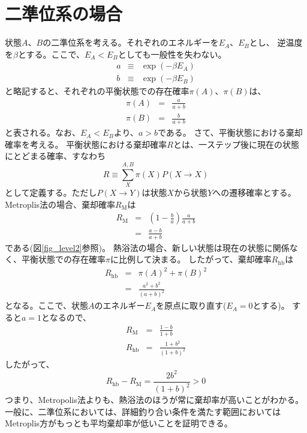 \documentclass{jarticle}
\begin{document}
\section{二準位系の場合}
状態$A$、$B$の二準位系を考える。それぞれのエネルギーを$E_A$、$E_B$とし、
逆温度を$\beta$とする。ここで、$E_A < E_B$としても一般性を失わない。
\begin{eqnarray}
a &\equiv& \exp(-\beta E_A)\\ 
b &\equiv& \exp(-\beta E_B)
\end{eqnarray}
と略記すると、それぞれの平衡状態での存在確率$\pi(A)$、$\pi(B)$は、
\begin{eqnarray}
\pi(A) &=& \frac{a}{a+b}\\
\pi(B) &=& \frac{b}{a+b}
\end{eqnarray}
と表される。なお、$E_A < E_B$より、$a>b$である。
さて、平衡状態における棄却確率を考える。
平衡状態における棄却確率$R$とは、一ステップ後に現在の状態にとどまる確率、すなわち
\begin{equation}
R \equiv \sum_X^{A,B} \pi(X) P(X \rightarrow X)
\end{equation}
として定義する。ただし$P(X \rightarrow Y)$は状態$X$から状態$Y$への遷移確率とする。
Metroplis法の場合、棄却確率$R_\mathrm{M}$は
\begin{eqnarray}
R_\mathrm{M} &=& \left(1 -\frac{b}{a}\right) \frac{a}{a+b} \\
&=& \frac{a-b}{a+b}
\end{eqnarray}
である(図\ref{fig_level2}参照)。
熱浴法の場合、新しい状態は現在の状態に関係なく、平衡状態での存在確率$\pi$に比例して決まる。
したがって、棄却確率$R_\mathrm{hb}$は
\begin{eqnarray}
R_\mathrm{hb} &=& \pi(A)^2 +\pi(B)^2\\
&=& \frac{a^2+b^2}{(a+b)^2}
\end{eqnarray}
となる。ここで、状態$A$のエネルギー$E_A$を原点に取り直す($E_A=0$とする)。
すると$a=1$となるので、
\begin{eqnarray}
R_\mathrm{M} &=& \frac{1-b}{1+b} \\
R_\mathrm{hb} &=& \frac{1+b^2}{(1+b)^2}
\end{eqnarray}
したがって、
\begin{equation}
R_\mathrm{hb} - R_\mathrm{M} = \frac{2 b^2}{(1+b)^2} >0
\end{equation}
つまり、Metropolis法よりも、熱浴法のほうが常に棄却率が高いことがわかる。
一般に、二準位系においては、詳細釣り合い条件を満たす範囲においては
Metroplis方がもっとも平均棄却率が低いことを証明できる。
\end{document}

